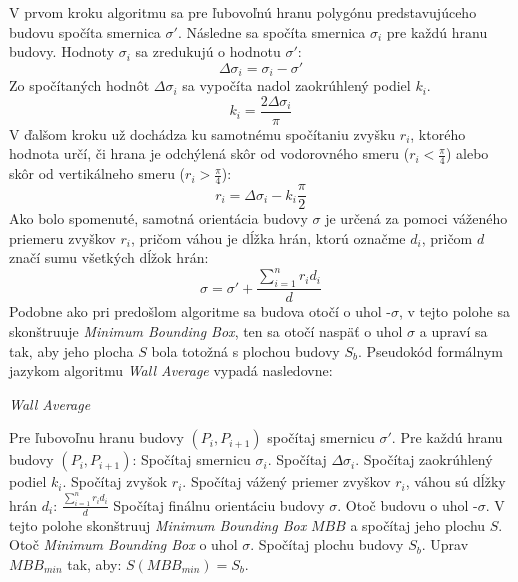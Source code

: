 \documentclass[11pt]{article}
\begin{document}
V prvom kroku algoritmu sa pre ľubovoľnú hranu polygónu predstavujúceho budovu spočíta smernica $\sigma'$. Následne sa spočíta smernica $\sigma_i$ pre každú hranu budovy. Hodnoty $\sigma_i$ sa zredukujú o hodnotu $\sigma'$:  
\begin{equation*}
\Delta \sigma_i = \sigma_i - \sigma'
\end{equation*}
Zo spočítaných hodnôt $\Delta \sigma_i$ sa vypočíta nadol zaokrúhlený podiel $k_i$.
\begin{equation*}
k_i = \frac{2\Delta \sigma_i}{\pi}
\end{equation*}
V ďalšom kroku už dochádza ku samotnému spočítaniu zvyšku $r_i$, ktorého hodnota určí, či hrana je odchýlená skôr od vodorovného smeru ($r_i < \frac{\pi}{4}$) alebo skôr od vertikálneho smeru ($r_i > \frac{\pi}{4}$):
\begin{equation*}
r_i = \Delta \sigma_i - k_i\frac{\pi}{2}
\end{equation*}
Ako bolo spomenuté, samotná orientácia budovy $\sigma$ je určená za pomoci váženého priemeru zvyškov $r_i$, pričom váhou je dĺžka hrán, ktorú označme $d_i$, pričom $d$ značí sumu všetkých dĺžok hrán:
\begin{equation*}
\sigma = \sigma' + \frac{\sum_{i=1}^{n} r_id_i}{d}
\end{equation*}
Podobne ako pri predošlom algoritme sa budova otočí o uhol -$\sigma$, v tejto polohe sa skonštruuje \textit{Minimum Bounding Box}, ten sa otočí naspäť o uhol $\sigma$ a upraví sa tak, aby jeho plocha $S$ bola totožná s plochou budovy $S_b$.
\newpage
\noindent Pseudokód formálnym jazykom algoritmu \textit{Wall Average} vypadá nasledovne:
\begin{algorithm}
    \caption {\textit{Wall Average}}
    \begin{algorithmic}[1]
        \State Pre ľubovoľnu hranu budovy $(P_i, P_{i+1})$ spočítaj smernicu $\sigma'$.
        \State Pre každú hranu budovy $(P_i, P_{i+1})$:
        \State \indent Spočítaj smernicu $\sigma_i$.
        \State \indent Spočítaj $\Delta \sigma_i$. 
        \State \indent Spočítaj zaokrúhlený podiel $k_i$.
        \State \indent Spočítaj zvyšok $r_i$.
        \State \indent Spočítaj vážený priemer zvyškov $r_i$, váhou sú dĺžky hrán $d_i$: $ \frac{\sum_{i=1}^{n} r_id_i}{d}$
     \State Spočítaj finálnu orientáciu budovy $\sigma$.
     \State Otoč budovu o uhol -$\sigma$.
     \State V tejto polohe skonštruuj \textit{Minimum Bounding Box} $MBB$ a spočítaj jeho plochu $S$.
     \State Otoč \textit{Minimum Bounding Box} o uhol $\sigma$.
     \State Spočítaj plochu budovy $S_b$.
     \State Uprav $MBB_{min}$ tak, aby: $S(MBB_{min}) = S_b$.
    \end{algorithmic}
\end{algorithm}
\end{document}
